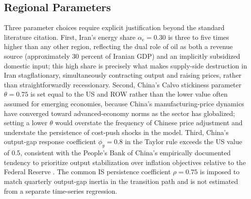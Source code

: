 \documentclass[12pt]{article}
\begin{document}
\subsection{Regional Parameters}

Three parameter choices require explicit justification beyond the standard literature citation. First, Iran's energy share $\alpha_e = 0.30$ is three to five times higher than any other region, reflecting the dual role of oil as both a revenue source (approximately 30 percent of Iranian GDP) and an implicitly subsidized domestic input; this high share is precisely what makes supply-side destruction in Iran stagflationary, simultaneously contracting output and raising prices, rather than straightforwardly recessionary. Second, China's Calvo stickiness parameter $\theta = 0.75$ is set equal to the US and ROW rather than the lower value often assumed for emerging economies, because China's manufacturing-price dynamics have converged toward advanced-economy norms as the sector has globalized; setting a lower $\theta$ would overstate the frequency of Chinese price adjustment and understate the persistence of cost-push shocks in the model. Third, China's output-gap response coefficient $\phi_y = 0.8$ in the Taylor rule exceeds the US value of 0.5, consistent with the People's Bank of China's empirically documented tendency to prioritize output stabilization over inflation objectives relative to the Federal Reserve \citep{gali2015monetary}. The common IS persistence coefficient $\rho=0.75$ is imposed to match quarterly output-gap inertia in the transition path and is not estimated from a separate time-series regression.
\end{document}
